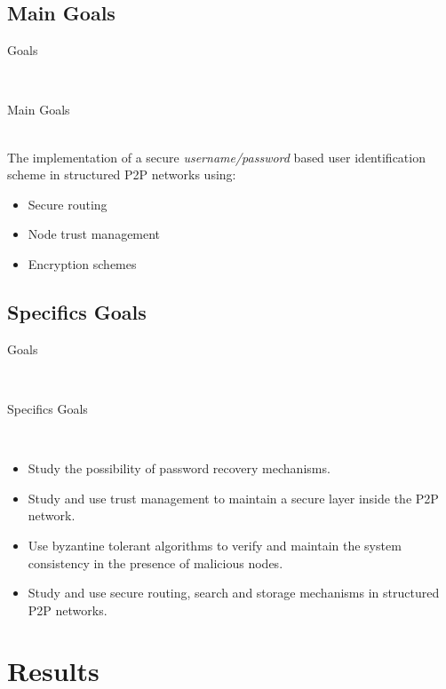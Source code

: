 \documentclass[12pt]{beamer}
\renewcommand{\frametitle}[1]{\vspace{0.2cm}\begin{huge}#1\end{huge}\\}
\renewcommand{\framesubtitle}[1]{\vspace{0.4cm} \hspace{0.4cm}\begin{large}#1\end{large}\\}
\begin{document}
  \subsection{Main Goals}
    \begin{frame}
    \frametitle{Goals}
    \framesubtitle{Main Goals}
    The implementation of a secure \textit{username/password} based user identification scheme in structured P2P
    networks using:
    \begin{itemize}
      \item  Secure routing
      \item  Node trust management 
      \item  Encryption schemes
    \end{itemize}
    \end{frame}

  \subsection{Specifics Goals}
    \begin{frame}
    \frametitle{Goals}
    \framesubtitle{Specifics Goals}
    \begin{itemize}
      \item Study the possibility of password recovery mechanisms.
      \item Study and use trust management to maintain a
            secure layer inside the P2P network.
      \item Use byzantine tolerant algorithms to verify and maintain the
            system consistency in the presence of malicious nodes.
      \item Study and use secure routing, search and storage mechanisms in
            structured P2P networks.
    \end{itemize}
    \end{frame}

  \section{Results}
\end{document}
